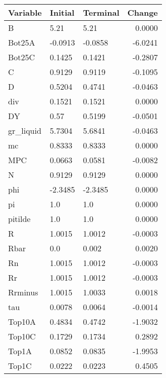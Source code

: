 \begin{table}
\centering
\label{tab:stst_comparison_fast_shock_wedge_permanent}
\begin{tabular}{lllr}
\toprule
                Variable & Initial & Terminal &  Change \\
\midrule
                       B &    5.21 &     5.21 &  0.0000 \\
                  Bot25A & -0.0913 &  -0.0858 & -6.0241 \\
                  Bot25C &  0.1425 &   0.1421 & -0.2807 \\
                       C &  0.9129 &   0.9119 & -0.1095 \\
                       D &  0.5204 &   0.4741 & -0.0463 \\
                     div &  0.1521 &   0.1521 &  0.0000 \\
                      DY &    0.57 &   0.5199 & -0.0501 \\
               gr\_liquid &  5.7304 &   5.6841 & -0.0463 \\
                      mc &  0.8333 &   0.8333 &  0.0000 \\
                     MPC &  0.0663 &   0.0581 & -0.0082 \\
                       N &  0.9129 &   0.9129 &  0.0000 \\
                     phi & -2.3485 &  -2.3485 &  0.0000 \\
                      pi &     1.0 &      1.0 &  0.0000 \\
                 pitilde &     1.0 &      1.0 &  0.0000 \\
                       R &  1.0015 &   1.0012 & -0.0003 \\
                    Rbar &     0.0 &    0.002 &  0.0020 \\
                      Rn &  1.0015 &   1.0012 & -0.0003 \\
                      Rr &  1.0015 &   1.0012 & -0.0003 \\
                 Rrminus &  1.0015 &   1.0033 &  0.0018 \\
                     tau &  0.0078 &   0.0064 & -0.0014 \\
                  Top10A &  0.4834 &   0.4742 & -1.9032 \\
                  Top10C &  0.1729 &   0.1734 &  0.2892 \\
                   Top1A &  0.0852 &   0.0835 & -1.9953 \\
                   Top1C &  0.0222 &   0.0223 &  0.4505 \\

\end{tabular}
\end{table}

